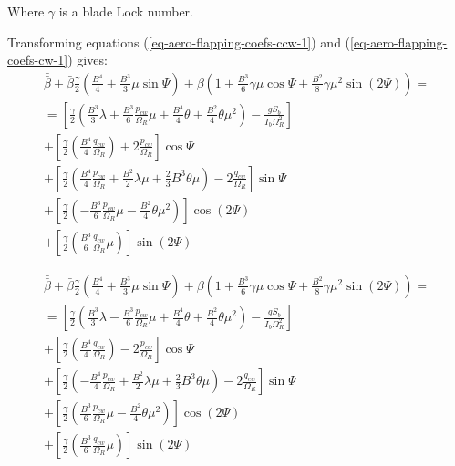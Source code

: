 Where $\gamma$ is a blade Lock number.

Transforming equations (\ref{eq-aero-flapping-coefs-ccw-1}) and (\ref{eq-aero-flapping-coefs-cw-1}) gives:
\begin{multline}
  \label{eq-aero-flapping-coefs-ccw-2}
  \bar{\bar \beta} + \bar \beta \frac{\gamma}{2}
  \left( \frac{B^4}{4} + \frac{B^3}{3} \mu \sin \Psi \right)
  + \beta \left(
    1 + \frac{B^3}{6} \gamma \mu \cos \Psi
    + \frac{B^2}{8} \gamma \mu^2 \sin \left( 2 \Psi \right)
  \right)
  = \\ =
  \left[
    \frac{\gamma}{2}
    \left(
        \frac{B^3}{3} \lambda
      + \frac{B^3}{6} \frac{p_{cw}}{\Omega_R} \mu
      + \frac{B^4}{4} \theta
      + \frac{B^2}{4} \theta \mu^2
    \right)
    - \frac{ g S_b }{ I_b \Omega_R^2 }
  \right]
  \\
  + \left[
    \frac{\gamma}{2}
    \left( \frac{B^4}{4} \frac{q_{cw}}{\Omega_R} \right)
    + 2 \frac{p_{cw}}{\Omega_R}
  \right] \cos \Psi
  \\
  + \left[
    \frac{\gamma}{2}
    \left(
        \frac{B^4}{4} \frac{p_{cw}}{\Omega_R}
      + \frac{B^2}{2} \lambda \mu
      + \frac{2}{3} B^3 \theta \mu
    \right)
    - 2 \frac{q_{cw}}{\Omega_R}
  \right] \sin \Psi
  \\
  + \left[
    \frac{\gamma}{2}
    \left(
      - \frac{B^3}{6} \frac{p_{cw}}{\Omega_R} \mu
      - \frac{B^2}{4} \theta \mu^2
    \right)
  \right] \cos \left( 2 \Psi \right)
  \\
  + \left[
    \frac{\gamma}{2}
    \left( \frac{B^3}{6} \frac{q_{cw}}{\Omega_R} \mu \right)
  \right] \sin \left( 2 \Psi \right)
\end{multline}

\vfill

\begin{multline}
  \label{eq-aero-flapping-coefs-cw-2}
  \bar{\bar \beta} + \bar \beta \frac{\gamma}{2}
  \left( \frac{B^4}{4} + \frac{B^3}{3} \mu \sin \Psi \right)
  + \beta \left(
    1 + \frac{B^3}{6} \gamma \mu \cos \Psi
    + \frac{B^2}{8} \gamma \mu^2 \sin \left( 2 \Psi \right)
  \right)
  = \\ =
  \left[
    \frac{\gamma}{2}
    \left(
        \frac{B^3}{3} \lambda
      - \frac{B^3}{6} \frac{p_{cw}}{\Omega_R} \mu
      + \frac{B^4}{4} \theta
      + \frac{B^2}{4} \theta \mu^2
    \right)
    - \frac{ g S_b }{ I_b \Omega_R^2 }
  \right]
  \\
  + \left[
    \frac{\gamma}{2}
    \left( \frac{B^4}{4} \frac{q_{cw}}{\Omega_R} \right)
    - 2 \frac{p_{cw}}{\Omega_R}
  \right] \cos \Psi
  \\
  + \left[
    \frac{\gamma}{2}
    \left(
      - \frac{B^4}{4} \frac{p_{cw}}{\Omega_R}
      + \frac{B^2}{2} \lambda \mu
      + \frac{2}{3} B^3 \theta \mu
    \right)
    - 2 \frac{q_{cw}}{\Omega_R}
  \right] \sin \Psi
  \\
  + \left[
    \frac{\gamma}{2}
    \left(
        \frac{B^3}{6} \frac{p_{cw}}{\Omega_R} \mu
      - \frac{B^2}{4} \theta \mu^2
    \right)
  \right] \cos \left( 2 \Psi \right)
  \\
  + \left[
    \frac{\gamma}{2}
    \left( \frac{B^3}{6} \frac{q_{cw}}{\Omega_R} \mu \right)
  \right] \sin \left( 2 \Psi \right)
\end{multline}

